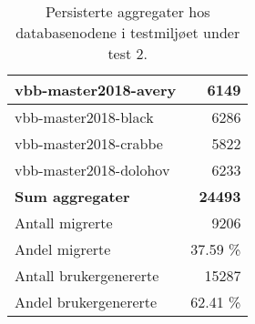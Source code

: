 \begin{table}[hbtp]
  \caption{Persisterte aggregater hos databasenodene i testmiljøet under test 2.}
  \begin{center}
    \begin{tabular}{ | l | r |}
      \hline
      vbb-master2018-avery & 6149 \\ \hline
      vbb-master2018-black & 6286 \\ \hline
      vbb-master2018-crabbe & 5822 \\ \hline
      vbb-master2018-dolohov & 6233 \\ \hline
      \textbf{Sum aggregater} & \textbf{24493} \\ \hline
      Antall migrerte & 9206 \\ \hline
      Andel migrerte & 37.59 \% \\ \hline
      Antall brukergenererte & 15287 \\ \hline
      Andel brukergenererte & 62.41 \% \\ \hline
    \end{tabular}
  \end{center}
  \label{backend2}
\end{table}

